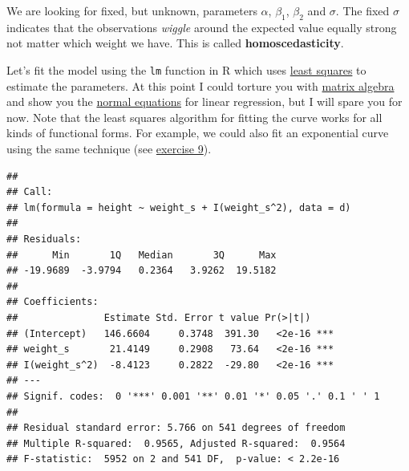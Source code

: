 \documentclass[
]{book}
\newenvironment{Shaded}{\begin{snugshade}}{\end{snugshade}}
\newcommand{\AttributeTok}[1]{\textcolor[rgb]{0.13,0.29,0.53}{#1}}
\newcommand{\CommentTok}[1]{\textcolor[rgb]{0.56,0.35,0.01}{\textit{#1}}}
\newcommand{\DecValTok}[1]{\textcolor[rgb]{0.00,0.00,0.81}{#1}}
\newcommand{\FloatTok}[1]{\textcolor[rgb]{0.00,0.00,0.81}{#1}}
\newcommand{\FunctionTok}[1]{\textcolor[rgb]{0.13,0.29,0.53}{\textbf{#1}}}
\newcommand{\NormalTok}[1]{#1}
\newcommand{\OtherTok}[1]{\textcolor[rgb]{0.56,0.35,0.01}{#1}}
\newcommand{\SpecialCharTok}[1]{\textcolor[rgb]{0.81,0.36,0.00}{\textbf{#1}}}
\begin{document}
We are looking for fixed, but unknown, parameters \(\alpha\), \(\beta_1\), \(\beta_2\) and \(\sigma\).
The fixed \(\sigma\) indicates that the observations \emph{wiggle} around the expected value
equally strong not matter which weight we have. This is called \textbf{homoscedasticity}.

Let's fit the model using the \texttt{lm} function in R which uses
\href{https://en.wikipedia.org/wiki/Least_squares}{least squares} to estimate the parameters.
At this point I could torture you with \href{https://en.wikipedia.org/wiki/Matrix_(mathematics)}{matrix algebra}
and show you the \href{https://en.wikipedia.org/wiki/Linear_least_squares}{normal equations} for linear regression,
but I will spare you for now.
Note that the least squares algorithm for fitting the curve works for all
kinds of functional forms. For example, we could also fit an exponential curve using the same
technique (see \hyperref[exercise9_multiple_regression]{exercise 9}).

\begin{Shaded}
\end{Shaded}

\begin{verbatim}
## 
## Call:
## lm(formula = height ~ weight_s + I(weight_s^2), data = d)
## 
## Residuals:
##      Min       1Q   Median       3Q      Max 
## -19.9689  -3.9794   0.2364   3.9262  19.5182 
## 
## Coefficients:
##               Estimate Std. Error t value Pr(>|t|)    
## (Intercept)   146.6604     0.3748  391.30   <2e-16 ***
## weight_s       21.4149     0.2908   73.64   <2e-16 ***
## I(weight_s^2)  -8.4123     0.2822  -29.80   <2e-16 ***
## ---
## Signif. codes:  0 '***' 0.001 '**' 0.01 '*' 0.05 '.' 0.1 ' ' 1
## 
## Residual standard error: 5.766 on 541 degrees of freedom
## Multiple R-squared:  0.9565, Adjusted R-squared:  0.9564 
## F-statistic:  5952 on 2 and 541 DF,  p-value: < 2.2e-16
\end{verbatim}
\end{document}
